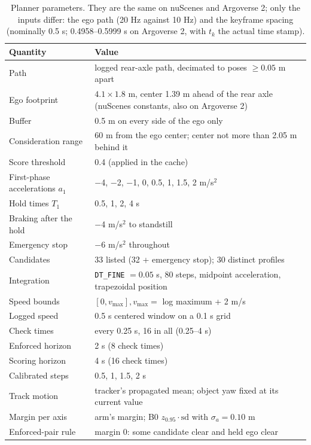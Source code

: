 \documentclass{ieeeaccess}
\begin{document}
\begin{table}[!t]
\centering
\caption{Planner parameters. They are the same on nuScenes and Argoverse 2; only the inputs differ: the ego path (20 Hz against 10 Hz) and the keyframe spacing (nominally 0.5 s; 0.4958--0.5999 s on Argoverse 2, with $t_{k}$ the actual time stamp).}
\label{tab:10}
\footnotesize
\setlength{\tabcolsep}{3pt}
\renewcommand{\arraystretch}{1.15}
\begin{tabular}{@{}L{0.282\columnwidth}L{0.688\columnwidth}@{}}
\hline
Quantity & Value \\
\hline
Path & logged rear-axle path, decimated to poses $\geq 0.05$ m apart \\
Ego footprint & $4.1 \times 1.8$ m, center 1.39 m ahead of the rear axle (nuScenes constants, also on Argoverse 2) \\
Buffer & 0.5 m on every side of the ego only \\
Consideration range & 60 m from the ego center; center not more than 2.05 m behind it \\
Score threshold & 0.4 (applied in the cache) \\
First-phase accelerations $a_{1}$ & $-$4, $-$2, $-$1, 0, 0.5, 1, 1.5, 2 m/s$^{2}$ \\
Hold times $T_{1}$ & 0.5, 1, 2, 4 s \\
Braking after the hold & $-$4 m/s$^{2}$ to standstill \\
Emergency stop & $-$6 m/s$^{2}$ throughout \\
Candidates & 33 listed (32 + emergency stop); 30 distinct profiles \\
Integration & \texttt{DT\_FINE} $= 0.05$ s, 80 steps, midpoint acceleration, trapezoidal position \\
Speed bounds & $[0, v_{\max}], v_{\max} =$ log maximum + 2 m/s \\
Logged speed & 0.5 s centered window on a 0.1 s grid \\
Check times & every 0.25 s, 16 in all (0.25--4 s) \\
Enforced horizon & 2 s (8 check times) \\
Scoring horizon & 4 s (16 check times) \\
Calibrated steps & 0.5, 1, 1.5, 2 s \\
Track motion & tracker's propagated mean; object yaw fixed at its current value \\
Margin per axis & arm's margin; B0 $z_{0.95}\cdot\mathrm{sd}$ with $\sigma_{a} = 0.10$ m \\
Enforced-pair rule & margin 0: some candidate clear and held ego clear \\

\end{tabular}
\end{table}
\end{document}
